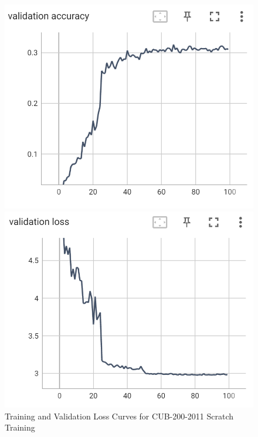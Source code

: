 \documentclass[UTF8]{ctexart}
\begin{document}
\begin{figure}[h]
        \vspace{0.5cm} %
    
        \begin{minipage}{0.45\textwidth}
            \centering
            \includegraphics[width=\textwidth]{figs/TensorBoard/CUB_scratch/scratch_val_acc.png}
        \end{minipage}
        \hfill
        \begin{minipage}{0.45\textwidth}
            \centering
            \includegraphics[width=\textwidth]{figs/TensorBoard/CUB_scratch/scratch_val_loss.png}
        \end{minipage}
        \caption{Training and Validation Loss Curves for CUB-200-2011 Scratch Training}
        \label{fig:scratchloss}
    \end{figure}
\end{document}
